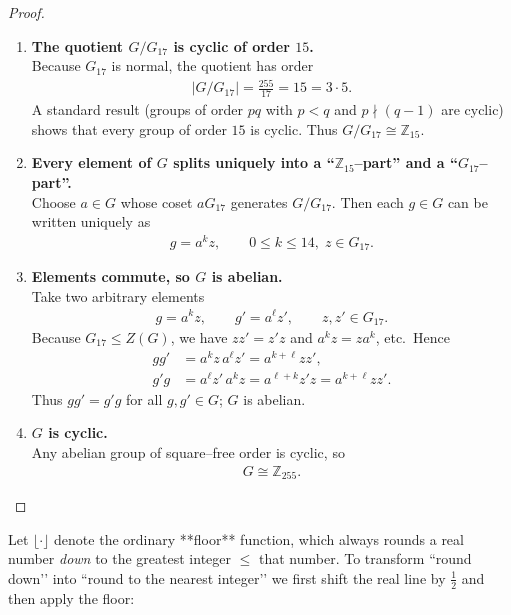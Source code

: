 \documentclass[12pt]{article}
\theoremstyle{definition} %
\theoremstyle{plain} %
\begin{document}
\begin{proof}
\begin{enumerate}
      \item \textbf{The quotient $G/G_{17}$ is cyclic of order $15$.}\\
            Because $G_{17}$ is normal, the quotient has order
            \begin{align}
                \lvert G/G_{17}\rvert = \frac{255}{17}=15 = 3\cdot 5 .
            \end{align}
            A standard result (groups of order $pq$ with $p<q$ and $p\nmid(q-1)$ are cyclic) shows that every group of order $15$ is cyclic.  Thus $G/G_{17}\cong\mathbb{Z}_{15}$.

      \item \textbf{Every element of $G$ splits uniquely into a ``$\mathbb{Z}_{15}$–part'' and a ``$G_{17}$–part''.}\\
            Choose $a\in G$ whose coset $aG_{17}$ generates $G/G_{17}$.
            Then each $g\in G$ can be written uniquely as
            \begin{align}
                g = a^{k}z, \qquad 0\le k\le 14,\;z\in G_{17}.
            \end{align}

      \item \textbf{Elements commute, so $G$ is abelian.}\\
            Take two arbitrary elements
            \begin{align}
                g  = a^{k}z,\qquad
                g' = a^{\ell}z',
                \qquad
                z,z'\in G_{17}.
            \end{align}
            Because $G_{17}\le Z(G)$, we have $zz' = z'z$ and $a^{k}z = za^{k}$, etc.\  Hence
            \begin{align}
                gg'
                &= a^{k}z\,a^{\ell}z'
                 = a^{k+\ell}zz' ,\\
                g'g
                &= a^{\ell}z'\,a^{k}z
                 = a^{\ell+k}z'z
                 = a^{k+\ell}zz' .
            \end{align}
            Thus $gg' = g'g$ for all $g,g'\in G$; $G$ is abelian.

      \item \textbf{$G$ is cyclic.}\\
            Any abelian group of square–free order is cyclic, so
            \begin{align}
                G \cong \mathbb{Z}_{255}.
            \end{align}
  \end{enumerate}
\end{proof}
Let \(\lfloor\cdot\rfloor\) denote the ordinary **floor** function, which always  
rounds a real number \emph{down} to the greatest integer \(\le\) that number.  
To transform “round down’’ into “round to the nearest integer’’ we first shift
the real line by \(\tfrac12\) and then apply the floor:
\end{document}
